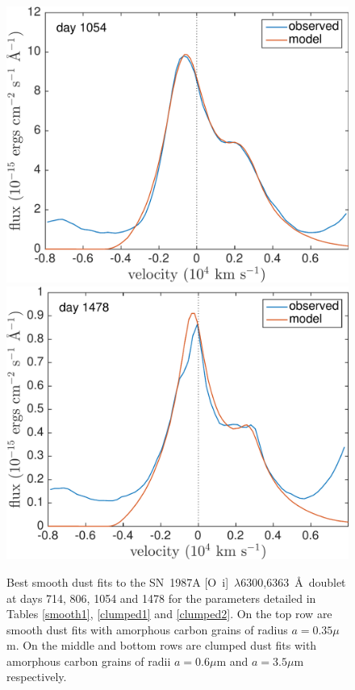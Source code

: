 \begin{figure}
\includegraphics[trim =0 0 0 -20,clip=true,scale=0.4]{chapters/chapter5/images/smooth/best_fit/d1054OI.pdf}
\hspace{1mm}
\includegraphics[trim =25 0 0 -20,clip=true,scale=0.4]{chapters/chapter5/images/smooth/best_fit/d1478OI.pdf}


\caption{Best smooth dust fits to the SN~1987A [O~{\sc i}]~$\lambda$6300,6363~\AA\ doublet at days 714, 806, 1054 and 1478 for the parameters detailed in Tables \ref{smooth1}, \ref{clumped1} and \ref{clumped2}.  On the top row are smooth dust fits with amorphous carbon grains of radius $a=0.35 \mu$m.  On the middle and bottom rows are clumped dust fits with amorphous carbon grains of radii $a=0.6 \mu$m and $a=3.5 \mu$m respectively.}
\label{OI_smooth}

\end{figure}
